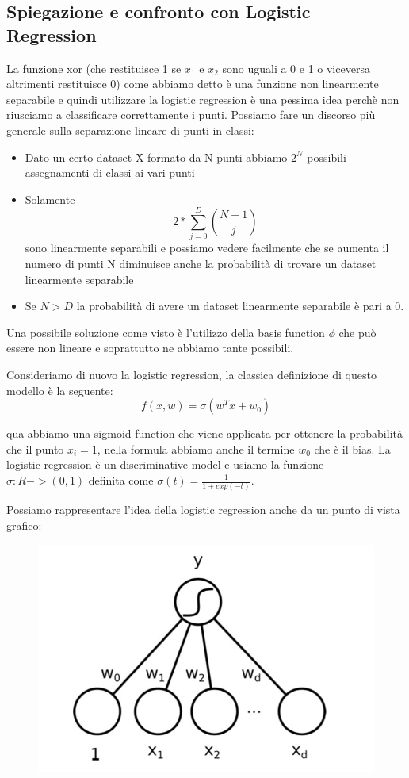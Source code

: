 \documentclass[14pt]{extreport}
\begin{document}
\subsection{Spiegazione e confronto con Logistic Regression}

La funzione xor (che restituisce 1 se $x_1$ e $x_2$ sono uguali a 0 e 1 o viceversa altrimenti restituisce 0) come abbiamo detto è una funzione non
linearmente separabile e quindi utilizzare la logistic regression è una pessima idea perchè non riusciamo a classificare correttamente i punti.
Possiamo fare un discorso più generale sulla separazione lineare di punti in classi:

\begin{itemize}
\item Dato un certo dataset X formato da N punti abbiamo $2^N$ possibili assegnamenti di classi ai vari punti
\item Solamente $$2*\sum_{j=0}^D \binom{N-1}{j}$$ sono linearmente separabili e possiamo vedere facilmente che se aumenta il numero di punti N
diminuisce anche la probabilità di trovare un dataset linearmente separabile
\item Se $N > D$ la probabilità di avere un dataset linearmente separabile è pari a 0.
\end{itemize}

Una possibile soluzione come visto è l'utilizzo della basis function $\phi$ che può essere non lineare e soprattutto ne abbiamo tante possibili.

Consideriamo di nuovo la logistic regression, la classica definizione di questo modello è la seguente:
$$f(x,w) = \sigma(w^Tx + w_0)$$

qua abbiamo una sigmoid function che viene applicata per ottenere la probabilità che il punto $x_i=1$, nella formula abbiamo anche il termine $w_0$
che è il bias. La logistic regression è un discriminative model e usiamo la funzione $\sigma: R->(0,1)$ definita come $\sigma(t) =
\frac{1}{1+exp(-t)}$.

Possiamo rappresentare l'idea della logistic regression anche da un punto di vista grafico:

\begin{figure}[H]
\centering
\includegraphics[width=0.7\linewidth]{359.jpeg}
\end{figure}
\end{document}
